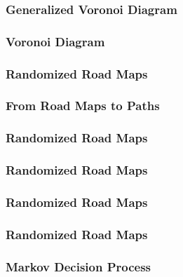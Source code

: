 \begin{frame}
	\frametitle{Generalized Voronoi Diagram}
	
\end{frame}

\begin{frame}
	\frametitle{Voronoi Diagram}
	
\end{frame}

\begin{frame}
	\frametitle{Randomized Road Maps}
	
\end{frame}

\begin{frame}
	\frametitle{From Road Maps to Paths}
	
\end{frame}

\begin{frame}
	\frametitle{Randomized Road Maps}
	
\end{frame}

\begin{frame}
	\frametitle{Randomized Road Maps}
	
\end{frame}

\begin{frame}
	\frametitle{Randomized Road Maps}
	
\end{frame}

\begin{frame}
	\frametitle{Randomized Road Maps}
	
\end{frame}

\begin{frame}
	\frametitle{Markov Decision Process}
	
\end{frame}

